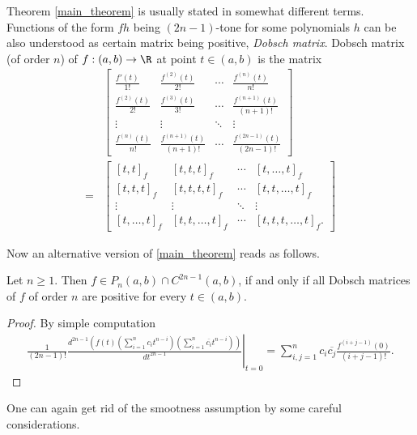 Theorem \ref{main_theorem} is usually stated in somewhat different terms. Functions of the form $f h$ being $(2 n - 1)$-tone for some polynomials $h$ can be also understood as certain matrix being positive, \textit{Dobsch matrix}. Dobsch matrix (of order $n$) of $f : (a, b) \to \R$ at point $t \in (a, b)$ is the matrix
\begin{align}\label{Dobsch_matrix}
	&\begin{bmatrix}
		\frac{f'(t)}{1!} & \frac{f^{(2)}(t)}{2!} & \cdots & \frac{f^{(n)}(t)}{n!} \\
		\frac{f^{(2)}(t)}{2!} & \frac{f^{(3)}(t)}{3!} & \cdots & \frac{f^{(n + 1)}(t)}{(n + 1)!} \\
		\vdots & \vdots & \ddots & \vdots \\
		\frac{f^{(n)}(t)}{n!} & \frac{f^{(n + 1)}(t)}{(n + 1)!} & \cdots &  \frac{f^{(2 n - 1)}(t)}{(2 n - 1)!}
	\end{bmatrix} \\
	=&
	\begin{bmatrix}
	[t, t]_{f} & [t, t, t]_{f} & \cdots & [t, \ldots, t]_{f}\\
	[t, t, t]_{f} & [t, t, t, t]_{f} & \cdots & [t, t, \ldots, t]_{f} \\
	\vdots & \vdots & \ddots & \vdots \\
	[t, \ldots, t]_{f} & [t, t, \ldots, t]_{f} & \cdots &  [t, t, t, \ldots, t]_{f}.
	\end{bmatrix} \nonumber
\end{align}

Now an alternative version of \ref{main_theorem} reads as follows.

\begin{lause}
	Let $n \geq 1$. Then $f \in P_{n}(a, b) \cap C^{2 n - 1}(a, b)$, if and only if all Dobsch matrices of $f$ of order $n$ are positive for every $t \in (a, b)$.
\end{lause}
\begin{proof}
	By simple computation
	\begin{align*}
		\left.\frac{1}{(2 n - 1)!} \frac{d^{2 n - 1}\left(f(t) \left(\sum_{i = 1}^{n} c_{i} t^{n - i}\right) \left(\sum_{i = 1}^{n} \overline{c_{i}} t^{n - i}\right)\right)}{d t^{2 n - 1}} \right|_{t = 0} = \sum_{i,j = 1}^{n} c_{i} \overline{c_{j}} \frac{f^{(i + j - 1)}(0)}{(i + j - 1)!}.
 	\end{align*}
\end{proof}

One can again get rid of the smootness assumption by some careful considerations.

